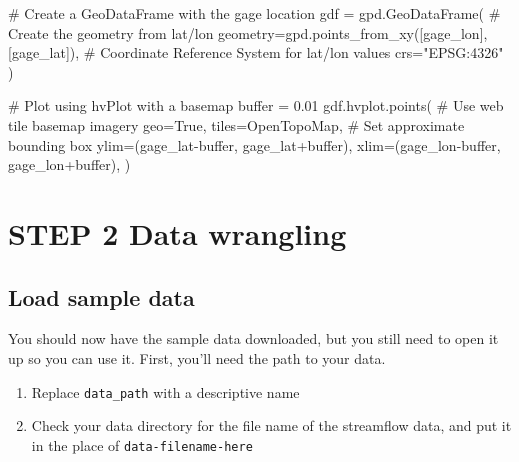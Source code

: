 \documentclass[
  letterpaper,
  DIV=11,
  numbers=noendperiod,
  oneside]{scrreprt}
\newenvironment{Shaded}{\begin{snugshade}}{\end{snugshade}}
\newcommand{\BuiltInTok}[1]{\textcolor[rgb]{0.00,0.23,0.31}{#1}}
\newcommand{\CommentTok}[1]{\textcolor[rgb]{0.37,0.37,0.37}{#1}}
\newcommand{\FloatTok}[1]{\textcolor[rgb]{0.68,0.00,0.00}{#1}}
\newcommand{\NormalTok}[1]{\textcolor[rgb]{0.00,0.23,0.31}{#1}}
\newcommand{\OperatorTok}[1]{\textcolor[rgb]{0.37,0.37,0.37}{#1}}
\newcommand{\StringTok}[1]{\textcolor[rgb]{0.13,0.47,0.30}{#1}}
\newcommand{\VariableTok}[1]{\textcolor[rgb]{0.07,0.07,0.07}{#1}}
\providecommand{\tightlist}{%
  \setlength{\itemsep}{0pt}\setlength{\parskip}{0pt}}
\begin{document}
\begin{Shaded}
\begin{Highlighting}[]
\CommentTok{\# Create a GeoDataFrame with the gage location}
\NormalTok{gdf }\OperatorTok{=}\NormalTok{ gpd.GeoDataFrame(}
    \CommentTok{\# Create the geometry from lat/lon}
\NormalTok{    geometry}\OperatorTok{=}\NormalTok{gpd.points\_from\_xy([gage\_lon], [gage\_lat]),}
    \CommentTok{\# Coordinate Reference System for lat/lon values}
\NormalTok{    crs}\OperatorTok{=}\StringTok{"EPSG:4326"}
\NormalTok{)}

\CommentTok{\# Plot using hvPlot with a basemap}
\BuiltInTok{buffer} \OperatorTok{=} \FloatTok{0.01}
\NormalTok{gdf.hvplot.points(}
    \CommentTok{\# Use web tile basemap imagery}
\NormalTok{    geo}\OperatorTok{=}\VariableTok{True}\NormalTok{, tiles}\OperatorTok{=}\StringTok{\textquotesingle{}OpenTopoMap\textquotesingle{}}\NormalTok{, }
    \CommentTok{\# Set approximate bounding box}
\NormalTok{    ylim}\OperatorTok{=}\NormalTok{(gage\_lat}\OperatorTok{{-}}\BuiltInTok{buffer}\NormalTok{, gage\_lat}\OperatorTok{+}\BuiltInTok{buffer}\NormalTok{),}
\NormalTok{    xlim}\OperatorTok{=}\NormalTok{(gage\_lon}\OperatorTok{{-}}\BuiltInTok{buffer}\NormalTok{, gage\_lon}\OperatorTok{+}\BuiltInTok{buffer}\NormalTok{),}
\NormalTok{)}
\end{Highlighting}
\end{Shaded}

\section{STEP 2 Data wrangling}\label{step-2-data-wrangling}

\subsection{Load sample data}\label{load-sample-data}

You should now have the sample data downloaded, but you still need to
open it up so you can use it. First, you'll need the path to your data.

\begin{tcolorbox}[enhanced jigsaw, colbacktitle=quarto-callout-color!10!white, opacityback=0, bottomtitle=1mm, toptitle=1mm, bottomrule=.15mm, left=2mm, colframe=quarto-callout-color-frame, leftrule=.75mm, opacitybacktitle=0.6, colback=white, rightrule=.15mm, toprule=.15mm, breakable, titlerule=0mm, title=\textcolor{quarto-callout-color}{\faInfo}\hspace{0.5em}{Try It}, coltitle=black, arc=.35mm]

\begin{enumerate}
\def\labelenumi{\arabic{enumi}.}
\tightlist
\item
  Replace \texttt{data\_path} with a descriptive name
\item
  Check your data directory for the file name of the streamflow data,
  and put it in the place of \texttt{data-filename-here}
\end{enumerate}

\end{tcolorbox}
\end{document}
